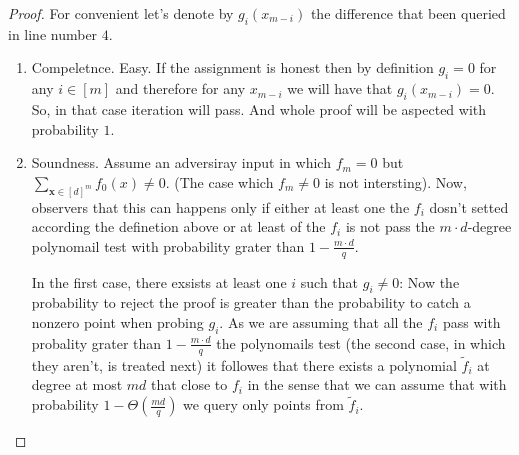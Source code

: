 \documentclass{article}
\begin{document}
\begin{proof} For convenient let's denote by $g_{i}\left( x_{m-i} \right)$ the difference that been queried in line number $4$. 
  \begin{enumerate}
    \item Compeletnce. Easy. If the assignment is honest then by definition $g_{i} = 0$ for any $i \in [m]$ and therefore for any $x_{m-i}$ we will have that $g_{i} \left( x_{m-i} \right) = 0$. So, in that case iteration will pass. And whole proof will be aspected  with probability $1$.  
    \item Soundness. Assume an adversiray input in which $f_{m} = 0$ but $\sum_{\mathbf{x} \in [d]^{m}}{f_{0}(x)}\neq 0$. (The case which $f_{m} \neq 0$ is not intersting). Now, observers that this can happens only if either at least one the $f_{i}$ dosn't setted according the definetion above or at least of the $f_{i}$ is not pass the $m\cdot d$-degree polynomail test with probability grater than $1 - \frac{m\cdot d}{q}$. 

      In the first case, there exsists at least one $i$ such that $g_{i}\neq 0$:
      Now the probability to reject the proof is greater than the probability to catch a nonzero point when probing $g_{i}$. As we are assuming that all the $f_{i}$ pass with probality grater than $1 - \frac{m\cdot d}{q}$ the polynomails test (the second case, in which they aren't, is treated next) it followes that there exists a polynomial $\tilde{f}_{i}$ at degree at most $md$ that close to $f_{i}$ in the sense that we can assume that with probability $1 - \Theta(\frac{md}{q})$ we query only points from $\tilde{f}_{i}$. 


\end{enumerate}
\end{proof}
\end{document}
